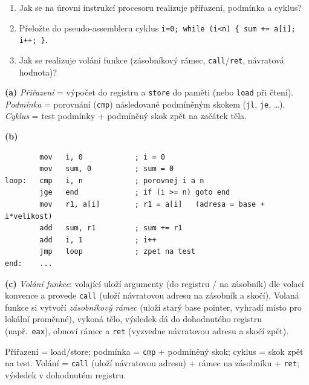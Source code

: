 \begin{zadani}
\begin{enumerate}[label=(\alph*)]
  \item {} Jak se na úrovni instrukcí procesoru realizuje přiřazení, podmínka a cyklus?
  \item {} Přeložte do pseudo-assembleru cyklus \texttt{i=0; while (i<n) \{ sum += a[i]; i++; \}}.
  \item {} Jak se realizuje volání funkce (zásobníkový rámec, \texttt{call}/\texttt{ret}, návratová hodnota)?
\end{enumerate}
\end{zadani}

\begin{reseni}
\textbf{(a)} \emph{Přiřazení} = výpočet do registru a \texttt{store} do paměti (nebo \texttt{load} při čtení). \emph{Podmínka} = porovnání (\texttt{cmp}) následované podmíněným skokem (\texttt{jl}, \texttt{je}, \dots). \emph{Cyklus} = test podmínky + podmíněný skok zpět na začátek těla.

\textbf{(b)}
\begin{lstlisting}
        mov   i, 0            ; i = 0
        mov   sum, 0          ; sum = 0
loop:   cmp   i, n            ; porovnej i a n
        jge   end             ; if (i >= n) goto end
        mov   r1, a[i]        ; r1 = a[i]   (adresa = base + i*velikost)
        add   sum, r1         ; sum += r1
        add   i, 1            ; i++
        jmp   loop            ; zpet na test
end:    ...
\end{lstlisting}

\textbf{(c)} \emph{Volání funkce}: volající uloží argumenty (do registru / na zásobník) dle volací konvence a provede \texttt{call} (uloží návratovou adresu na zásobník a skočí). Volaná funkce si vytvoří \emph{zásobníkový rámec} (uloží starý base pointer, vyhradí místo pro lokální proměnné), vykoná tělo, výsledek dá do dohodnutého registru (např.\ \texttt{eax}), obnoví rámec a \texttt{ret} (vyzvedne návratovou adresu a skočí zpět).
\end{reseni}

\begin{jadro}
Přiřazení = load/store; podmínka = \texttt{cmp} + podmíněný skok; cyklus = skok zpět na test. Volání = \texttt{call} (uloží návratovou adresu) + rámec na zásobníku + \texttt{ret}; výsledek v dohodnutém registru.
\end{jadro}

